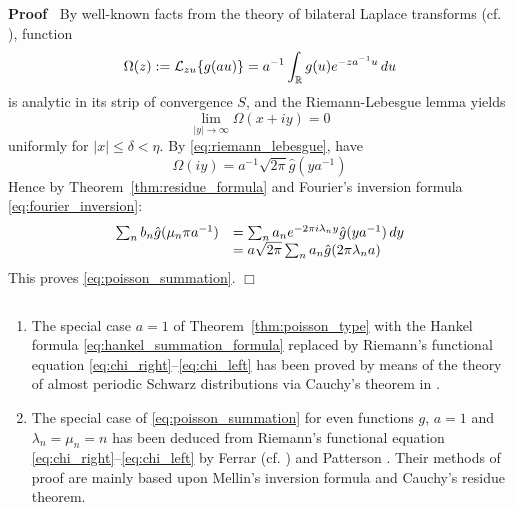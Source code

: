 \documentclass{article}
\newcommand{\assign}{:=}
\newcommand{\tmdummy}{$\mbox{}$}
\newenvironment{proof}{\noindent\textbf{Proof\ }}{\hspace*{\fill}$\Box$\medskip}
\begin{document}
\begin{proof}
  By well-known facts from the theory of bilateral Laplace transforms (cf.
  {\cite{16}}), function
  \begin{equation}
    \Omega (z) \assign \mathcal{L}_{zu}  \{g (au)\} = a^{- 1} 
    \int_{\mathbb{R}} g (u) e^{- za^{- 1} u}  \hspace{0.17em} du
    \label{eq:poisson_proof_1}
  \end{equation}
  is analytic in its strip of convergence $S$, and the Riemann-Lebesgue lemma
  yields
  \begin{equation}
    \lim_{|y| \to \infty} \Omega (x + iy) = 0 \label{eq:riemann_lebesgue}
  \end{equation}
  uniformly for $|x| \leq \delta < \eta$. By \eqref{eq:riemann_lebesgue}, have
  \begin{equation}
    \Omega (iy) = a^{- 1}  \sqrt{2 \pi}  \hat{g} (ya^{- 1})
    \label{eq:poisson_proof_2}
  \end{equation}
  Hence by Theorem~\ref{thm:residue_formula} and Fourier's inversion formula
  \eqref{eq:fourier_inversion}:
  \begin{equation}
    \begin{array}{ll}
      \sum_n b_n  \hat{g} (\mu_n \pi a^{- 1}) & = \sum_n a_n e^{- 2 \pi i
      \lambda_n y}  \hat{g} (ya^{- 1})  \hspace{0.17em} dy\\
      & = a \sqrt{2 \pi}  \sum_n a_n  \hat{g} (2 \pi \lambda_n a)
    \end{array} \label{eq:poisson_proof_3}
  \end{equation}
  This proves \eqref{eq:poisson_summation}.
\end{proof}

\begin{remark}
  \label{rem:poisson_remarks}{\tmdummy}
  
  \begin{enumerate}
    \item The special case $a = 1$ of Theorem~\ref{thm:poisson_type} with the
    Hankel formula \eqref{eq:hankel_summation_formula} replaced by Riemann's
    functional equation \eqref{eq:chi_right}--\eqref{eq:chi_left} has been
    proved by means of the theory of almost periodic Schwarz distributions via
    Cauchy's theorem in {\cite{22}}.
    
    \item The special case of \eqref{eq:poisson_summation} for even functions
    $g$, $a = 1$ and $\lambda_n = \mu_n = n$ has been deduced from Riemann's
    functional equation \eqref{eq:chi_right}--\eqref{eq:chi_left} by Ferrar
    (cf. {\cite{1,18}}) and Patterson {\cite{26}}. Their methods of proof are
    mainly based upon Mellin's inversion formula and Cauchy's residue theorem.
  \end{enumerate}
\end{remark}
\end{document}
